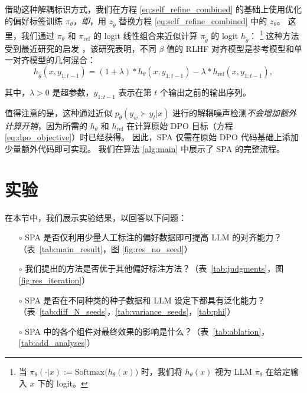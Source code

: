 借助这种解耦标识方式，我们在方程 \ref{eq:self_refine_combined} 的基础上使用优化的偏好标签训练 $\pi_{\theta}$，\textit{即}，用 $z_{\widetilde{\theta}}$ 替换方程 \ref{eq:self_refine_combined} 中的 $z_{\theta}$。  
这里，我们通过 $\pi_{\theta}$ 和 $\pi_{\text{ref}}$ 的 logit 线性组合来近似计算 $\pi_{\widetilde{\theta}}$ 的 logit $h_{\widetilde{\theta}}$：
\footnote{当 $\pi_{\theta}(\cdot|x):=\text{Softmax}\big(h_{\theta}(x)\big)$ 时，我们将 $h_{\theta}(x)$ 视为 LLM $\pi_{\theta}$ 在给定输入 $x$ 下的 logit。}  
这种方法受到最近研究的启发 \citep{liu2024decoding}，该研究表明，不同 $\beta$ 值的 RLHF 对齐模型是参考模型和单一对齐模型的几何混合：
\begin{equation}\label{eq:detail_realign}
    h_{\widetilde{\theta}}(x,y_{1:t-1})  = (1 + \lambda) \ast h_{\theta}(x, y_{1:t-1}) - \lambda \ast h_{\text{ref}}(x, y_{1:t-1}),
\end{equation}

其中，$\lambda > 0$ 是超参数，$y_{1:t-1}$ 表示在第 $t$ 个输出之前的输出序列。  

值得注意的是，这种通过近似 $p_{\widetilde{\theta}}(y_{w} \succ y_{l} | x)$ 进行的解耦噪声检测\textit{不会增加额外计算开销}，因为所需的 $h_{\theta}$ 和 $h_{\text{ref}}$ 在计算原始 DPO 目标（方程 \ref{eq:dpo_objective}）时已经获得。  
因此，SPA 仅需在原始 DPO 代码基础上添加少量额外代码即可实现。  
我们在算法 \ref{alg:main} 中展示了 SPA 的完整流程。

\section{实验} \label{sec:experiments}

在本节中，我们展示实验结果，以回答以下问题：
\begin{itemize}[leftmargin=5.5mm,topsep=0pt]\vspace{-0.04in}
    \item[$\circ$] SPA 是否仅利用少量人工标注的偏好数据即可提高 LLM 的对齐能力？（表~\ref{tab:main_result}，图 \ref{fig:res_no_seed}）\vspace{-0.04in}
    \item[$\circ$] 我们提出的方法是否优于其他偏好标注方法？（表~\ref{tab:judgments}，图 \ref{fig:res_iteration}）\vspace{-0.04in}
    \item[$\circ$] SPA 是否在不同种类的种子数据和 LLM 设定下都具有泛化能力？（表~\ref{tab:diff_N_seeds}，\ref{tab:variance_seeds}，\ref{tab:phi}）\vspace{-0.04in}
    \item[$\circ$] SPA 中的各个组件对最终效果的影响是什么？（表~\ref{tab:ablation}，\ref{tab:add_analyses}）\vspace{-0.04in}
\end{itemize}

